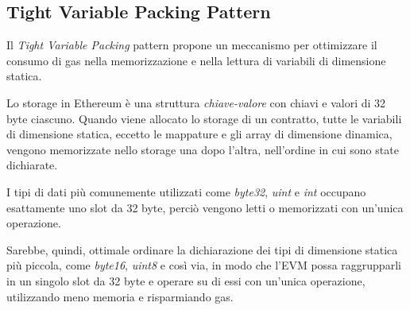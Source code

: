 {{		\begin{table}[H]
			\centering
			\caption{Specifiche del String Equality Comparison Pattern}
		\end{table}
	}
	{\subsection{Tight Variable Packing Pattern}
	Il \textit{Tight Variable Packing} pattern propone un meccanismo per ottimizzare il consumo di gas nella memorizzazione e nella lettura di variabili di dimensione statica.\par
	Lo storage in Ethereum è una struttura \textit{chiave-valore} con chiavi e valori di 32 byte ciascuno. Quando viene allocato lo storage di un contratto, tutte le variabili di dimensione statica, eccetto le mappature e gli array di dimensione dinamica, vengono memorizzate nello storage una dopo l'altra, nell'ordine in cui sono state dichiarate.\par I tipi di dati più comunemente utilizzati come \textit{byte32}, \textit{uint} e \textit{int} occupano esattamente uno slot da 32 byte, perciò vengono letti o memorizzati con un'unica operazione.\par
	Sarebbe, quindi, ottimale ordinare la dichiarazione dei tipi di dimensione statica più piccola, come \textit{byte16}, \textit{uint8} e così via, in modo che l'EVM possa raggrupparli in un singolo slot da 32 byte e operare su di essi con un'unica operazione, utilizzando meno memoria e risparmiando gas.
}}
